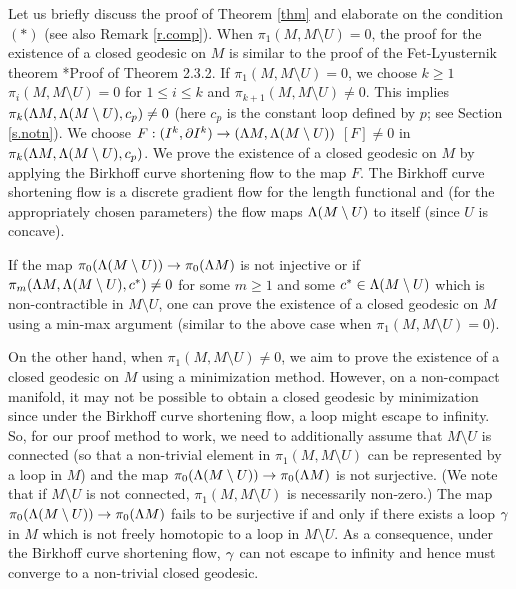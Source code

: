 \documentclass[11pt,twoside]{article}
\begin{document}
Let us briefly discuss the proof of Theorem \ref{thm} and elaborate on the condition $(*)$ (see also Remark \ref{r.comp}). When $\pi_1(M,M\setminus U)=0$, the proof for the existence of a closed geodesic on $M$ is similar to the proof of the Fet-Lyusternik theorem \cite{Moore}*{Proof of Theorem 2.3.2}. If \(\pi_1(M,M\setminus U)=0\), we choose \(k\geq 1\) \st \(\pi_i(M,M\setminus U)=0\) for \(1\leq i \leq k\) and \(\pi_{k+1}(M,M\setminus U)\neq 0\). This implies \(\pi_k(\Lambda M,\Lambda (M\setminus U),c_p)\neq 0\) (here $c_p$ is the constant loop defined by $p$; see Section \ref{s.notn}). We choose \(F:(I^k,\partial I^k)\rightarrow (\Lambda M,\Lambda (M\setminus U)) \) \st \([F]\neq 0\) in \(\pi_k(\Lambda M,\Lambda (M\setminus U),c_p)\). We prove the existence of a closed geodesic on $M$ by applying the Birkhoff curve shortening flow to the map $F$. The Birkhoff curve shortening flow is a discrete gradient flow for the length functional and (for the appropriately chosen parameters) the flow maps $\Lambda (M\setminus U)$ to itself (since $U$ is concave).  

If the map $\pi_0(\Lambda (M\setminus U))\rightarrow \pi_0(\Lambda M)$ is not injective or if \(\pi_m(\Lambda M, \Lambda (M\setminus U), c^*)\neq 0\) for some \(m\geq 1\) and some \(c^* \in \Lambda (M\setminus U)\) which is non-contractible in \(M\setminus U\), one can prove the existence of a closed geodesic on $M$ using a min-max argument (similar to the above case when \(\pi_1(M,M\setminus U)=0\)). 

On the other hand, when \(\pi_1(M,M\setminus U)\neq 0\), we aim to prove the existence of a closed geodesic on $M$ using a minimization method. However, on a non-compact manifold, it may not be possible to obtain a closed geodesic by minimization since under the Birkhoff curve shortening flow, a loop might escape to infinity. So, for our proof method to work, we need to additionally assume that \(M\setminus U\) is connected (so that a non-trivial element in $\pi_1(M,M\setminus U)$ can be represented by a loop in $M$) and the map $\pi_0(\Lambda (M\setminus U))\rightarrow \pi_0(\Lambda M)$ is not surjective. (We note that if \(M\setminus U\) is not connected, $\pi_1(M,M\setminus U)$ is necessarily non-zero.) The map $\pi_0(\Lambda (M\setminus U))\rightarrow \pi_0(\Lambda M)$ fails to be surjective if and only if there exists a loop $\gamma$ in $M$ which is not freely homotopic to a loop in $M\setminus U$. As a consequence, under the Birkhoff curve shortening flow, $\gamma$ can not escape to infinity and hence must converge to a non-trivial closed geodesic.
\end{document}
